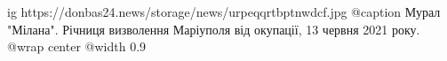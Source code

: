 
 
 
 
 

\ifcmt
  ig https://donbas24.news/storage/news/urpeqqrtbptnwdcf.jpg
	@caption Мурал "Мілана". Річниця визволення Маріуполя від окупації, 13 червня 2021 року.
  @wrap center
  @width 0.9
\fi
